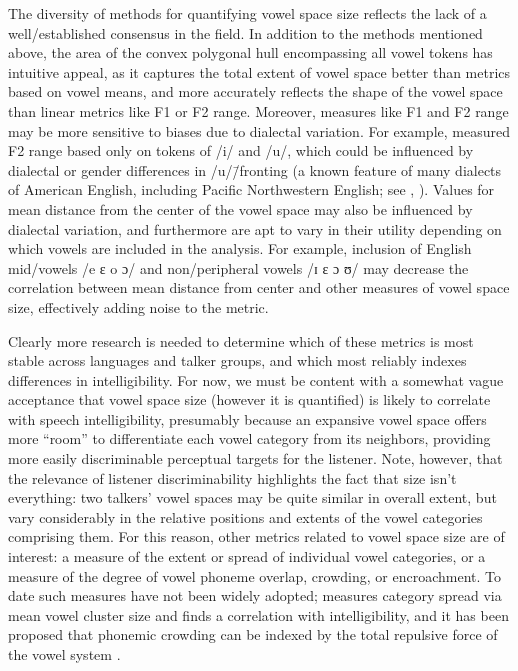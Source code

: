 The diversity of methods for quantifying vowel space size reflects the lack of a well\-/established consensus in the field.  In addition to the methods mentioned above, the area of the convex polygonal hull encompassing all vowel tokens has intuitive appeal, as it captures the total extent of vowel space better than metrics based on vowel means, and more accurately reflects the shape of the vowel space than linear metrics like F1 or F2 range.  Moreover, measures like F1 and F2 range may be more sensitive to biases due to dialectal variation.  For example, \citeauthor*{HazanMarkham2004} measured F2 range based only on tokens of /i/ and /u/, which could be influenced by dialectal or gender differences in /u/\=/fronting (a known feature of many dialects of American English, including Pacific Northwestern English; see \citealt{Reed1952}, \citealt[ch. 4]{Ward2003}).  Values for mean distance from the center of the vowel space may also be influenced by dialectal variation, and furthermore are apt to vary in their utility depending on which vowels are included in the analysis.  For example, inclusion of English mid\-/vowels /e ɛ o ɔ/ and non\-/peripheral vowels /ɪ ɛ ɔ ʊ/ may decrease the correlation between mean distance from center and other measures of vowel space size, effectively adding noise to the metric.\footnotemark{}


Clearly more research is needed to determine which of these metrics is most stable across languages and talker groups, and which most reliably indexes differences in intelligibility.  For now, we must be content with a somewhat vague acceptance that vowel space size (however it is quantified) is likely to correlate with speech intelligibility, presumably because an expansive vowel space offers more “room” to differentiate each vowel category from its neighbors, providing more easily discriminable perceptual targets for the listener.  Note, however, that the relevance of listener discriminability highlights the fact that size isn’t everything: two talkers’ vowel spaces may be quite similar in overall extent, but vary considerably in the relative positions and extents of the vowel categories comprising them.  For this reason, other metrics related to vowel space size are of interest: a measure of the extent or spread of individual vowel categories, or a measure of the degree of vowel phoneme overlap, crowding, or encroachment.  To date such measures have not been widely adopted; \citet{McCloyEtAl2013} measures category spread via mean vowel cluster size and finds a correlation with intelligibility, and it has been proposed that phonemic crowding can be indexed by the total repulsive force of the vowel system \citep[see][]{Wright2004a, McCloyEtAl2013}.


